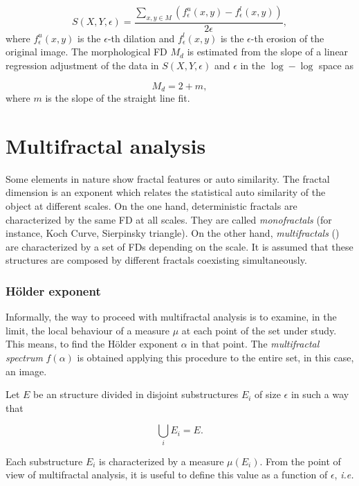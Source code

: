 \documentclass[oneside,a4paper,english,links]{article}
\begin{document}
\begin{equation}
S(X,Y,\epsilon) = \frac{\sum_{x,y \in M} (f_{\epsilon}^{u}(x,y) - f_{\epsilon}^{l}(x,y))}{2\epsilon},
\label{eqn:eqn2}
\end{equation}
\noindent
where $f_{\epsilon}^{u}(x,y)$ is the $\epsilon$-th dilation and $f_{\epsilon}^{l}(x,y)$ is the $\epsilon$-th erosion of the original image. The morphological FD $M_{d}$ is estimated from the slope of a linear regression adjustment of the data in $S(X,Y,\epsilon)$ and $\epsilon$ in the $\log-\log$ space as

\begin{equation}
M_{d} = 2 + m,
\label{eqn:eqn3}
\end{equation}
\noindent
where $m$ is the slope of the straight line fit.

\section{Multifractal analysis}
Some elements in nature show fractal features or auto similarity. The fractal dimension is an exponent which relates the statistical auto similarity of the object at different scales. On the one hand, deterministic fractals are characterized by the same FD at all scales. They are called {\em monofractals} (for instance, Koch Curve, Sierpinsky triangle). On the other hand, {\em multifractals} (\cite{Mandelbrot89}) are characterized by a set of FDs depending on the scale. It is assumed that these structures are composed by different fractals coexisting simultaneously.

\subsubsection{H\"older exponent}
Informally, the way to proceed with multifractal analysis is to examine, in the limit, the local behaviour of a measure $\mu$ at each point of the set under study. This means, to find the H\"older exponent $\alpha$ in that point. The {\em multifractal spectrum} $f(\alpha)$ is obtained applying this procedure to the entire set, in this case, an image.

Let $E$ be an structure divided in disjoint substructures $E_{i}$ of size $\epsilon$ in such a way that 

\begin{equation}
\displaystyle\bigcup_{i}E_{i} = E.
\end{equation}

Each substructure $E_{i}$ is characterized by a measure $\mu(E_{i})$. From the point of view of multifractal analysis, it is useful to define this value as a function of $\epsilon$, {\em i.e.}
\end{document}
